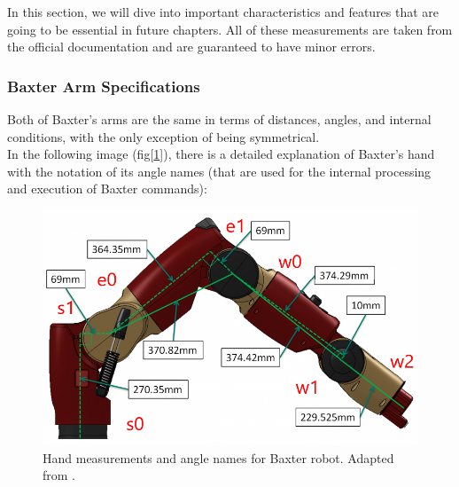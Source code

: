 \documentclass[11pt]{report} %
\begin{document}
In this section, we will dive into important characteristics and features that are going to be essential in future chapters. All of these measurements are taken from the official documentation and are guaranteed to have minor errors.\\

\subsubsection{Baxter Arm Specifications}

Both of Baxter's arms are the same in terms of distances, angles, and internal conditions, with the only exception of being symmetrical.\\

In the following image (fig[\ref{fig_baxter_hand_measurements}]), there is a detailed explanation of Baxter's hand with the notation of its angle names (that are used for the internal processing and execution of Baxter commands):

\begin{figure}[H]
    \centering
    \includegraphics[width=0.7\linewidth]{assets/imgs/baxter_robot/baxter_arm_specifications.png}
    \caption{Hand measurements and angle names for Baxter robot. Adapted from \citep{cite_baxter_hardware_specifications}.} 
    \label{fig_baxter_hand_measurements}
\end{figure}
\end{document}
